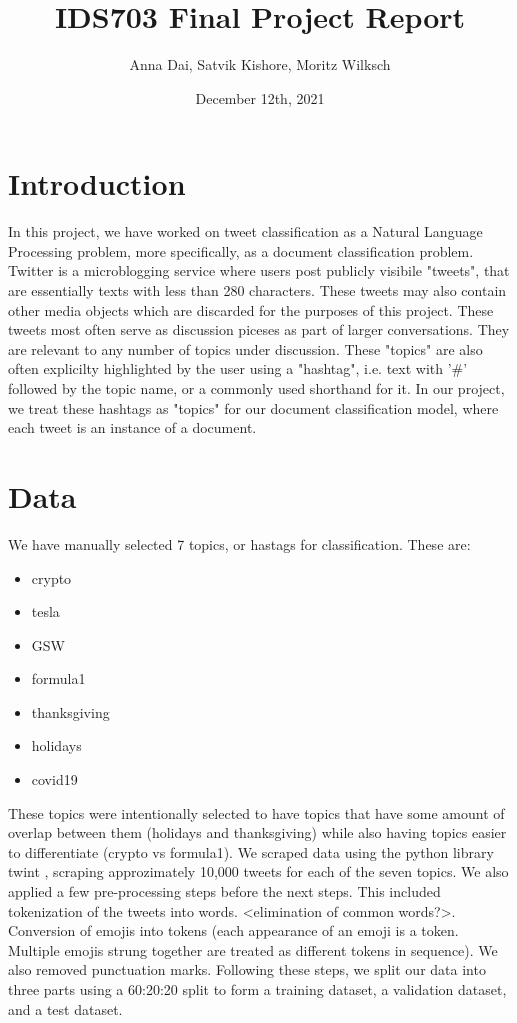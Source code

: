 \documentclass[11pt]{article}
\title{IDS703 Final Project Report}
\author{Anna Dai, Satvik Kishore, Moritz Wilksch}
\date{December 12th, 2021}
\begin{document}
\maketitle

\section{Introduction}

In this project, we have worked on tweet classification as a Natural Language Processing problem, more specifically, as a document classification problem. Twitter is a microblogging service where users post publicly visibile "tweets", that are essentially texts with less than 280 characters. These tweets may also contain other media objects which are discarded for the purposes of this project. These tweets most often serve as discussion piceses as part of larger conversations. They are relevant to any number of topics under discussion. These "topics" are also often explicilty highlighted by the user using a "hashtag", i.e. text with '\#' followed by the topic name, or a commonly used shorthand for it. In our project, we treat these hashtags as "topics" for our document classification model, where each tweet is an instance of a document.

\section{Data}
We have manually selected 7 topics, or hastags for classification. These are:  
\begin{itemize}
  \item crypto
  \item tesla
  \item GSW
  \item formula1
  \item thanksgiving
  \item holidays
  \item covid19
\end{itemize}

These topics were intentionally selected to have topics that have some amount of overlap between them (holidays and thanksgiving) while also having topics easier to differentiate (crypto vs formula1). We scraped data using the python library twint \cite{twint}, scraping approzimately 10,000 tweets for each of the seven topics. We also applied a few pre-processing steps before the next steps. This included tokenization of the tweets into words. <elimination of common words?>. Conversion of emojis into tokens (each appearance of an emoji is a token. Multiple emojis strung together are treated as different tokens in sequence). We also removed punctuation marks. Following these steps, we split our data into three parts using a 60:20:20 split to form a training dataset, a validation dataset, and a test dataset. 
\end{document}
